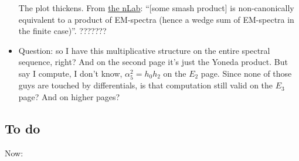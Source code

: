 \documentclass{MetricNotes2023}
\begin{document}
\begin{itemize}
The plot thickens. From \href{https://ncatlab.org/nlab/show/Eilenberg-Mac+Lane+spectrum}{the nLab}: ``[some smash product] is non-canonically equivalent to a product of EM-spectra (hence a wedge sum of EM-spectra in the finite case)''. ???????

\item Question: so I have this multiplicative structure on the entire spectral sequence, right? And on the second page it's just the Yoneda product. But say I compute, I don't know, \(\alpha^2_5=h_0h_2\) on the \(E_2\)  page. Since none of those guys are touched by differentials, is that computation still valid on the \(E_3\) page? And on higher pages?
\end{itemize}

\subsection{To do}\label{2503221342}

Now:
\end{document}
